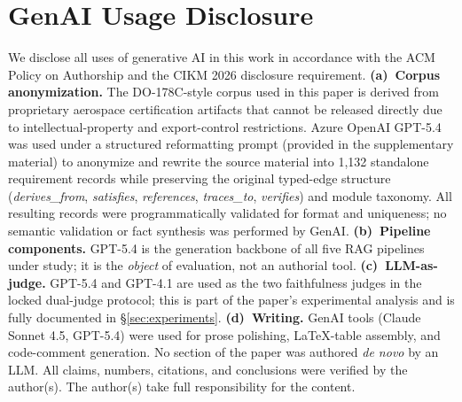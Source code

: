 \section*{GenAI Usage Disclosure}
\label{sec:disclosure}
We disclose all uses of generative AI in this work in accordance with
the ACM Policy on Authorship and the CIKM 2026 disclosure requirement.
\textbf{(a)~Corpus anonymization.} The DO-178C-style corpus used in
this paper is derived from proprietary aerospace certification
artifacts that cannot be released directly due to intellectual-property
and export-control restrictions. Azure OpenAI GPT-5.4 was used under
a structured reformatting prompt (provided in the supplementary
material) to anonymize and rewrite the source material into 1{,}132
standalone requirement records while preserving the original typed-edge
structure (\textit{derives\_from}, \textit{satisfies},
\textit{references}, \textit{traces\_to}, \textit{verifies}) and
module taxonomy. All resulting records were programmatically validated
for format and uniqueness; no semantic validation or fact synthesis
was performed by GenAI.
\textbf{(b)~Pipeline components.} GPT-5.4 is the generation backbone
of all five RAG pipelines under study; it is the \textit{object} of
evaluation, not an authorial tool.
\textbf{(c)~LLM-as-judge.} GPT-5.4 and GPT-4.1 are used as the two
faithfulness judges in the locked dual-judge protocol; this is part
of the paper's experimental analysis and is fully documented in
\S\ref{sec:experiments}.
\textbf{(d)~Writing.} GenAI tools (Claude Sonnet 4.5, GPT-5.4) were
used for prose polishing, LaTeX-table assembly, and code-comment
generation. No section of the paper was authored \textit{de novo} by
an LLM. All claims, numbers, citations, and conclusions were verified
by the author(s). The author(s) take full responsibility for the
content.
